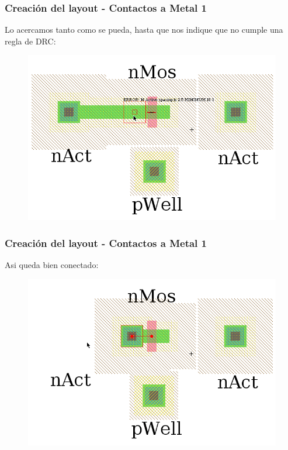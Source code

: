 \documentclass{beamer}
\begin{document}
\begin{frame}
\frametitle{Creación del layout - Contactos a Metal 1}
Lo acercamos tanto como se pueda, hasta que nos indique que no cumple una regla de DRC:
\begin{figure}
  \includegraphics[width=0.89\linewidth]{figuras/edicionElectric-8bb.png}
\end{figure}
\end{frame}
\begin{frame}
\frametitle{Creación del layout - Contactos a Metal 1}
Asi queda bien conectado:
\begin{figure}
  \includegraphics[width=0.89\linewidth]{figuras/edicionElectric-8bbb.png}
\end{figure}
\end{frame}
\end{document}
